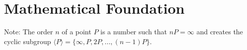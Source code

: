 \section{Mathematical Foundation}

Note: The order \(n\) of a point \(P\) is a number such that \(nP = \infty\) and creates
the cyclic subgroup \(\langle P \rangle = \{ \infty, P, 2P, ..., (n-1)P \} \).



